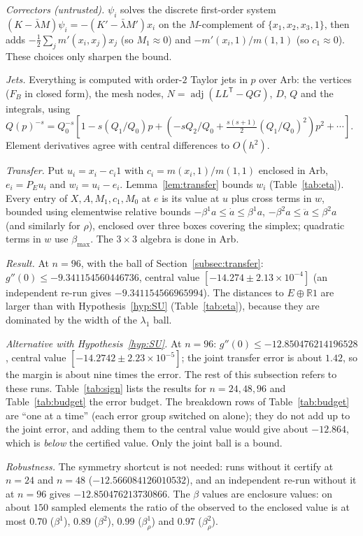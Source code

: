 \documentclass[11pt]{amsart}
\theoremstyle{definition}
\theoremstyle{remark}
\newcommand{\R}{\mathbb{R}}
\newcommand{\FB}{F_B}
\begin{document}
\emph{Correctors (untrusted).} $\psi_i$ solves the discrete first-order system
$(K-\bar\lambda M)\psi_i=-(K'-\bar\lambda M')x_i$ on the $M$-complement of $\{x_1,x_2,x_3,1\}$, then
adds $-\tfrac12\sum_jm'(x_i,x_j)x_j$ (so $M_1\approx0$) and $-m'(x_i,1)/m(1,1)$ (so $c_1\approx0$). These
choices only sharpen the bound.

\emph{Jets.} Everything is computed with order-$2$ Taylor jets in $p$ over Arb: the vertices
($\FB$ in closed form), the mesh nodes, $N=\operatorname{adj}(LL^{\mathsf T}-QG)$, $D$, $Q$ and the
integrals, using
$Q(p)^{-s}=Q_0^{-s}[1-s(Q_1/Q_0)p+(-sQ_2/Q_0+\tfrac{s(s+1)}2(Q_1/Q_0)^2)p^2+\cdots]$.
Element derivatives agree with central differences to $O(h^2)$.

\emph{Transfer.} Put $u_i=x_i-c_i1$ with $c_i=m(x_i,1)/m(1,1)$ enclosed in Arb, $e_i=P_Eu_i$ and
$w_i=u_i-e_i$. Lemma~\ref{lem:transfer} bounds $w_i$ (Table~\ref{tab:eta}). Every entry of $X,A,M_1,c_1,M_0$
at $e$ is its value at $u$ plus cross terms in $w$, bounded using elementwise relative bounds
$-\beta^1a\le\dot a\le\beta^1a$, $-\beta^2a\le\ddot a\le\beta^2a$ (and similarly for $\rho$), enclosed over
three boxes covering the simplex; quadratic terms in $w$ use $\beta_{\max}$. The $3\times3$ algebra is
done in Arb.

\emph{Result.} At $n=96$, with the ball of Section~\ref{subsec:transfer}:
$g''(0)\le-9.341154560446736$, central value $[-14.274\pm2.13\times10^{-4}]$ (an independent re-run gives
$-9.341154566965994$). The distances to $E\oplus\R1$ are larger than with Hypothesis~\ref{hyp:SU}
(Table~\ref{tab:eta}), because they are dominated by the width of the $\lambda_1$ ball.

\emph{Alternative with Hypothesis~\ref{hyp:SU}.} At $n=96$:
$g''(0)\le-12.850476214196528$, central value $[-14.2742\pm2.23\times10^{-5}]$; the joint transfer
error is about $1.42$, so the margin is about nine times the error. The rest of this subsection
refers to these runs. Table~\ref{tab:sign} lists the
results for $n=24,48,96$ and Table~\ref{tab:budget} the error budget. The breakdown rows of
Table~\ref{tab:budget} are ``one at a time'' (each error group switched on alone); they do not add
up to the joint error, and adding them to the central value would give about $-12.864$, which is
\emph{below} the certified value. Only the joint ball is a bound.

\emph{Robustness.} The symmetry shortcut is not needed: runs without it certify at $n=24$ and
$n=48$ ($-12.566084126010532$), and an independent re-run without it at $n=96$ gives
$-12.850476213730866$. The $\beta$ values are enclosure values: on about $150$ sampled elements the
ratio of the observed to the enclosed value is at most $0.70$ ($\beta^1$), $0.89$ ($\beta^2$), $0.99$
($\beta^1_\rho$) and $0.97$ ($\beta^2_\rho$).
\end{document}
